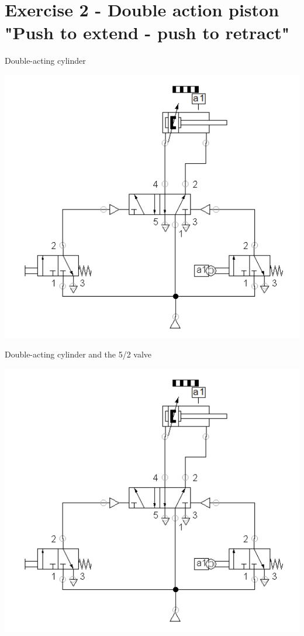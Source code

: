 \documentclass[presentation,aspectratio=1610]{beamer}
\begin{document}
\section{Exercise 2 - Double action piston "Push to extend - push to retract"}
\label{sec:org810d1a1}
\begin{frame}[label={sec:org7c9f1be}]{Double-acting cylinder}
\begin{center}
\includegraphics[width=0.7\linewidth]{../../figures/valve-52.png}
\end{center}
\end{frame}
\begin{frame}[label={sec:org2bd930f}]{Double-acting cylinder and the 5/2 valve}
\begin{center}
\includegraphics[width=0.7\linewidth]{../../figures/valve-52.png}
\end{center}
\end{frame}
\end{document}
